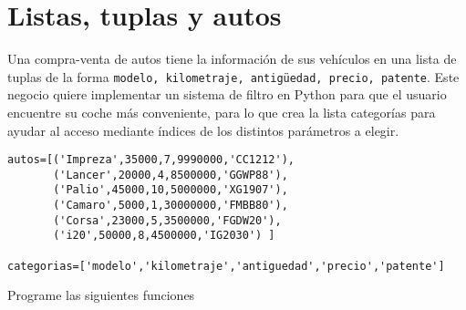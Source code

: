 \section{Listas, tuplas y autos}

Una compra-venta de autos tiene la información de sus vehículos en una lista de tuplas de la forma \texttt{modelo, kilometraje, antigüedad, precio, patente}. Este negocio quiere implementar un sistema de filtro en Python para que el usuario encuentre su coche más conveniente, para lo que crea la lista categorías para ayudar al acceso mediante índices de los distintos parámetros a elegir.

\begin{lstlisting}[style=consola]
autos=[('Impreza',35000,7,9990000,'CC1212'),
       ('Lancer',20000,4,8500000,'GGWP88'),
       ('Palio',45000,10,5000000,'XG1907'),
       ('Camaro',5000,1,30000000,'FMBB80'),
       ('Corsa',23000,5,3500000,'FGDW20'),
       ('i20',50000,8,4500000,'IG2030') ]
        
categorias=['modelo','kilometraje','antiguedad','precio','patente']
\end{lstlisting}

Programe las siguientes funciones


